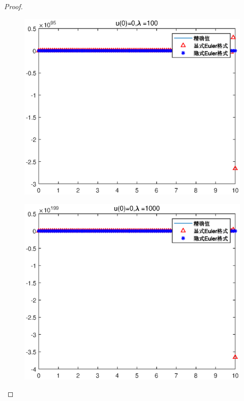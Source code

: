 \documentclass{article}%
\begin{document}
\begin{proof}
\begin{figure}
	\includegraphics[width=1\linewidth]{pic/week7_1_3.eps}
	\label{Fig:3}
	\caption{} 
\end{figure}
\begin{figure}
	\includegraphics[width=1\linewidth]{pic/week7_1_4.eps}
	\label{Fig:4}
	\caption{} 
\end{figure}
\begin{figure}

\end{figure}
\end{proof}
\end{document}
